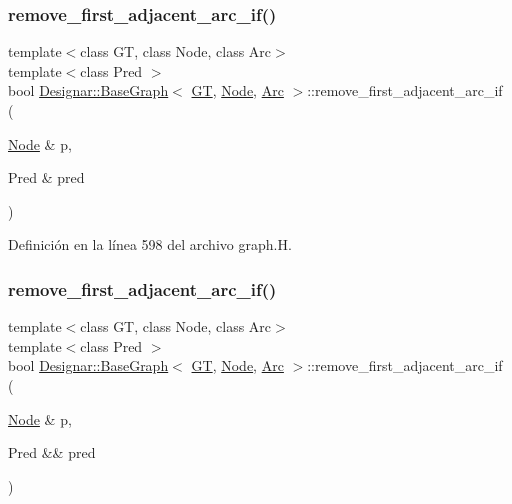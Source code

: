 \subsubsection{\texorpdfstring{remove\+\_\+first\+\_\+adjacent\+\_\+arc\+\_\+if()}{remove\_first\_adjacent\_arc\_if()}\hspace{0.1cm}{\footnotesize\ttfamily [1/2]}}
{\footnotesize\ttfamily template$<$class GT, class Node, class Arc$>$ \\
template$<$class Pred $>$ \\
bool \hyperlink{class_designar_1_1_base_graph}{Designar\+::\+Base\+Graph}$<$ \hyperlink{demo-buildgraph_8_c_a3001c40d2c31ca87ed96cd7d1334a55e}{GT}, \hyperlink{namespace_designar_a5af326c65aa2bd26b26c410f2030d09e}{Node}, \hyperlink{namespace_designar_a3f55fb5513d62ff47cbc8f72b8e95d6f}{Arc} $>$\+::remove\+\_\+first\+\_\+adjacent\+\_\+arc\+\_\+if (\begin{DoxyParamCaption}\item[{\hyperlink{namespace_designar_a5af326c65aa2bd26b26c410f2030d09e}{Node} \&}]{p,  }\item[{Pred \&}]{pred }\end{DoxyParamCaption})\hspace{0.3cm}{\ttfamily [inline]}}



Definición en la línea 598 del archivo graph.\+H.

\mbox{\label{class_designar_1_1_base_graph_abe36f7676c51362b9a0f560d3c062772}} 
\subsubsection{\texorpdfstring{remove\+\_\+first\+\_\+adjacent\+\_\+arc\+\_\+if()}{remove\_first\_adjacent\_arc\_if()}\hspace{0.1cm}{\footnotesize\ttfamily [2/2]}}
{\footnotesize\ttfamily template$<$class GT, class Node, class Arc$>$ \\
template$<$class Pred $>$ \\
bool \hyperlink{class_designar_1_1_base_graph}{Designar\+::\+Base\+Graph}$<$ \hyperlink{demo-buildgraph_8_c_a3001c40d2c31ca87ed96cd7d1334a55e}{GT}, \hyperlink{namespace_designar_a5af326c65aa2bd26b26c410f2030d09e}{Node}, \hyperlink{namespace_designar_a3f55fb5513d62ff47cbc8f72b8e95d6f}{Arc} $>$\+::remove\+\_\+first\+\_\+adjacent\+\_\+arc\+\_\+if (\begin{DoxyParamCaption}\item[{\hyperlink{namespace_designar_a5af326c65aa2bd26b26c410f2030d09e}{Node} \&}]{p,  }\item[{Pred \&\&}]{pred }\end{DoxyParamCaption})\hspace{0.3cm}{\ttfamily [inline]}}



